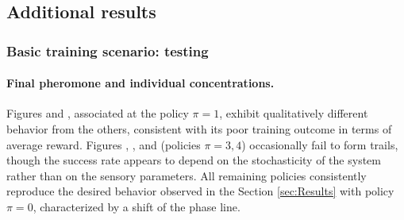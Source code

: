 \subsection{Additional results}
\subsubsection{Basic training scenario: testing}
\label{sec:additional_res_var}
\paragraph{Final pheromone and individual concentrations.}
Figures  and , associated at the policy $\pi=1$, exhibit qualitatively different
    behavior from the others, consistent with its poor training outcome in terms of average reward.
    Figures , , 
    and  (policies $\pi=3,4$) occasionally fail to form trails, though the success
    rate appears to depend on the stochasticity of the system rather than on the sensory parameters.
    All remaining policies consistently reproduce the desired behavior observed in the Section \ref{sec:Results}
    with policy $\pi=0$, characterized by a shift of the phase line.

